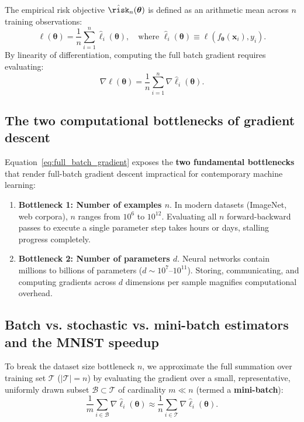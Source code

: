 The empirical risk objective $\hat{\risk}_n(\boldsymbol{\theta})$ is defined as an arithmetic mean across $n$ training observations:
\begin{equation}
\ell(\boldsymbol{\theta}) = \frac{1}{n} \sum_{i=1}^n \hat{\ell}_i(\boldsymbol{\theta}), \quad \text{where } \hat{\ell}_i(\boldsymbol{\theta}) \equiv \ell(f_{\boldsymbol{\theta}}(\mathbf{x}_i), y_i).
\label{eq:sum_loss_structure}
\end{equation}
By linearity of differentiation, computing the full batch gradient requires evaluating:
\begin{equation}
\nabla \ell(\boldsymbol{\theta}) = \frac{1}{n} \sum_{i=1}^n \nabla \hat{\ell}_i(\boldsymbol{\theta}).
\label{eq:full_batch_gradient}
\end{equation}

\subsection{The two computational bottlenecks of gradient descent}
\label{sec:two_bottlenecks_gd}

Equation~\eqref{eq:full_batch_gradient} exposes the \textbf{two fundamental bottlenecks} that render full-batch gradient descent impractical for contemporary machine learning:
\begin{enumerate}
  \item \textbf{Bottleneck 1: Number of examples $n$}. In modern datasets (ImageNet, web corpora), $n$ ranges from $10^6$ to $10^{12}$. Evaluating all $n$ forward-backward passes to execute a single parameter step takes hours or days, stalling progress completely.
  \item \textbf{Bottleneck 2: Number of parameters $d$}. Neural networks contain millions to billions of parameters ($d \sim 10^7$--$10^{11}$). Storing, communicating, and computing gradients across $d$ dimensions per sample magnifies computational overhead.
\end{enumerate}

\subsection{Batch vs. stochastic vs. mini-batch estimators and the MNIST speedup}
\label{sec:gradient_estimators_taxonomy}

To break the dataset size bottleneck $n$, we approximate the full summation over training set $\mathcal{T}$ ($|\mathcal{T}| = n$) by evaluating the gradient over a small, representative, uniformly drawn subset $\mathcal{B} \subset \mathcal{T}$ of cardinality $m \ll n$ (termed a \textbf{mini-batch}):
\begin{equation}
\frac{1}{m} \sum_{i \in \mathcal{B}} \nabla \hat{\ell}_i(\boldsymbol{\theta}) \approx \frac{1}{n} \sum_{i \in \mathcal{T}} \nabla \hat{\ell}_i(\boldsymbol{\theta}).
\label{eq:minibatch_approximation}
\end{equation}

